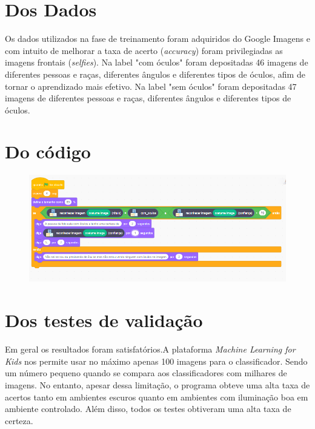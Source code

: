\documentclass{article}
\begin{document}
\section{Dos Dados}
Os dados utilizados na fase de treinamento foram adquiridos do Google Imagens e com intuito de melhorar a taxa de acerto (\textit{accuracy}) foram privilegiadas as imagens frontais (\textit{selfies}). Na label "com óculos" foram depositadas 46 imagens de diferentes pessoas e raças, diferentes ângulos e diferentes tipos de óculos, afim de tornar o aprendizado mais efetivo. Na label "sem óculos" foram depositadas 47 imagens de diferentes pessoas e raças, diferentes ângulos e diferentes tipos de óculos.

\section{Do código}
\par
\begin{figure}[ht]
    \centering
    \includegraphics[scale= 0.4]{projeto IC.png}
    \label{imagem_um}
\end{figure}

\section{Dos testes de validação}
Em geral os resultados foram satisfatórios.A plataforma \textit{Machine Learning for Kids} nos permite usar no máximo apenas 100 imagens para o classificador. Sendo um número pequeno quando se compara aos classificadores com milhares de imagens. No entanto, apesar dessa limitação, o programa obteve uma alta taxa de acertos tanto em ambientes escuros quanto em ambientes com iluminação boa em ambiente controlado. Além disso, todos os testes obtiveram uma alta taxa de certeza.
\end{document}
